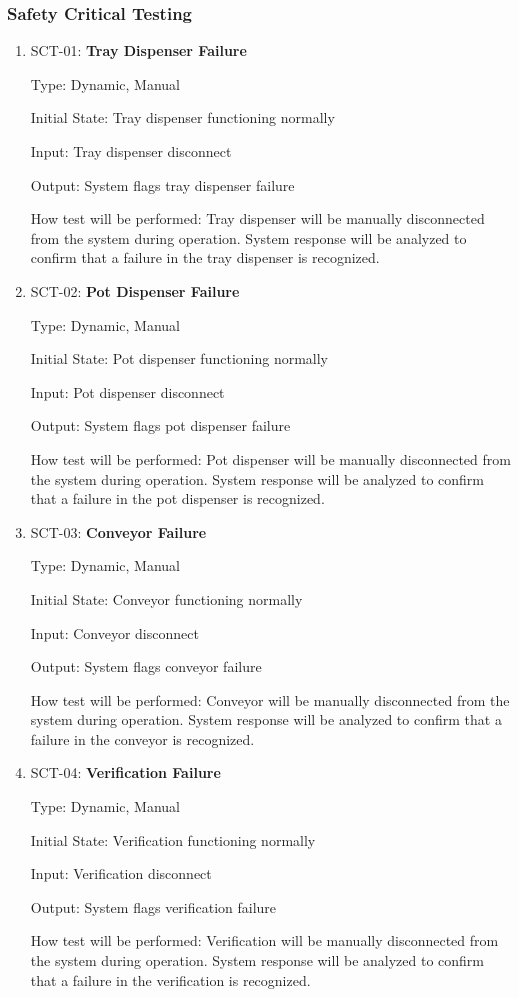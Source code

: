 \documentclass[12pt, titlepage]{article}
\begin{document}
\subsubsection{Safety Critical Testing}

\begin{enumerate}

  \item{SCT-01: \textbf{Tray Dispenser Failure}}

  Type: Dynamic, Manual
					
  Initial State: Tray dispenser functioning normally
					
  Input: Tray dispenser disconnect
					
  Output: System flags tray dispenser failure
					
  How test will be performed: Tray dispenser will be manually disconnected from the system during operation. System response 
  will be analyzed to confirm that a failure in the tray dispenser is recognized.
\\		
  \item{SCT-02: \textbf{Pot Dispenser Failure}}

  Type: Dynamic, Manual
					
  Initial State: Pot dispenser functioning normally
					
  Input: Pot dispenser disconnect
					
  Output: System flags pot dispenser failure
					
  How test will be performed: Pot dispenser will be manually disconnected from the system during operation. System response 
  will be analyzed to confirm that a failure in the pot dispenser is recognized.
\\
  \item{SCT-03: \textbf{Conveyor Failure}}

  Type: Dynamic, Manual
					
  Initial State: Conveyor functioning normally
					
  Input: Conveyor disconnect
					
  Output: System flags conveyor failure
					
  How test will be performed: Conveyor will be manually disconnected from the system during operation. System response 
  will be analyzed to confirm that a failure in the conveyor is recognized.
\\
  \item{SCT-04: \textbf{Verification Failure}}

  Type: Dynamic, Manual
					
  Initial State: Verification functioning normally
					
  Input: Verification disconnect
					
  Output: System flags verification failure
					
  How test will be performed: Verification will be manually disconnected from the system during operation. System response 
  will be analyzed to confirm that a failure in the verification is recognized.


\end{enumerate}
\end{document}
